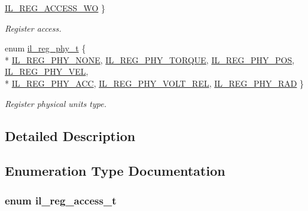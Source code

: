 \begin{DoxyCompactItemize}
\hyperlink{group__IL__REGS_gga4c623bd7d0d5f059dd91949c6948147eadb0026436ae70de8a60920c1085561bb}{I\+L\+\_\+\+R\+E\+G\+\_\+\+A\+C\+C\+E\+S\+S\+\_\+\+WO}
 \}\begin{DoxyCompactList}\small\item\em Register access. \end{DoxyCompactList}
\item 
enum \hyperlink{group__IL__REGS_ga37538453e5c3d84733c628987a579590}{il\+\_\+reg\+\_\+phy\+\_\+t} \{ \\*
\hyperlink{group__IL__REGS_gga37538453e5c3d84733c628987a579590a34d96ac8a7b9afc02256a03d5a464822}{I\+L\+\_\+\+R\+E\+G\+\_\+\+P\+H\+Y\+\_\+\+N\+O\+NE}, 
\hyperlink{group__IL__REGS_gga37538453e5c3d84733c628987a579590a799176bbdcea555949cd68969361bc8f}{I\+L\+\_\+\+R\+E\+G\+\_\+\+P\+H\+Y\+\_\+\+T\+O\+R\+Q\+UE}, 
\hyperlink{group__IL__REGS_gga37538453e5c3d84733c628987a579590ad7bdcaae981dfbbd28c46bed55f947ac}{I\+L\+\_\+\+R\+E\+G\+\_\+\+P\+H\+Y\+\_\+\+P\+OS}, 
\hyperlink{group__IL__REGS_gga37538453e5c3d84733c628987a579590aea1c9cf80466e862af6a3a6f687550ef}{I\+L\+\_\+\+R\+E\+G\+\_\+\+P\+H\+Y\+\_\+\+V\+EL}, 
\\*
\hyperlink{group__IL__REGS_gga37538453e5c3d84733c628987a579590a3dc604058c640ad2997c5d4a1ad37b97}{I\+L\+\_\+\+R\+E\+G\+\_\+\+P\+H\+Y\+\_\+\+A\+CC}, 
\hyperlink{group__IL__REGS_gga37538453e5c3d84733c628987a579590a99385428e977da83262b2ad47bcfc8f0}{I\+L\+\_\+\+R\+E\+G\+\_\+\+P\+H\+Y\+\_\+\+V\+O\+L\+T\+\_\+\+R\+EL}, 
\hyperlink{group__IL__REGS_gga37538453e5c3d84733c628987a579590a0cad6fc9aa35ccf3b78d695f9a446e2e}{I\+L\+\_\+\+R\+E\+G\+\_\+\+P\+H\+Y\+\_\+\+R\+AD}
 \}\begin{DoxyCompactList}\small\item\em Register physical units type. \end{DoxyCompactList}
\end{DoxyCompactItemize}


\subsection{Detailed Description}


\subsection{Enumeration Type Documentation}
\subsubsection[{\texorpdfstring{il\+\_\+reg\+\_\+access\+\_\+t}{il_reg_access_t}}]{\setlength{\rightskip}{0pt plus 5cm}enum {\bf il\+\_\+reg\+\_\+access\+\_\+t}}\hypertarget{group__IL__REGS_ga4c623bd7d0d5f059dd91949c6948147e}{}\label{group__IL__REGS_ga4c623bd7d0d5f059dd91949c6948147e}



